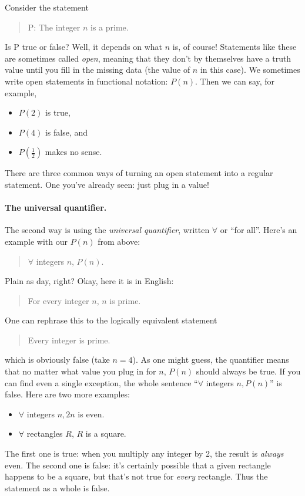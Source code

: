 \documentclass{tufte-book}
\begin{document}
Consider the statement
\begin{quote}
  P: The integer $n$ is a prime.
\end{quote}
Is P true or false? Well, it depends on what $n$ is, of course! Statements like these are sometimes called \emph{open}, meaning that they don't by themselves have a truth value until you fill in the missing data (the value of $n$ in this case). We sometimes write open statements in functional notation: $P(n)$. Then we can say, for example,
\begin{itemize}
    \item $P(2)$ is true,
    \item $P(4)$ is false, and
    \item $P(\frac12)$ makes no sense.
\end{itemize}

  There are three common ways of turning an open statement into a regular statement. One you've already seen: just plug in a value!

\paragraph{The universal quantifier.}
\label{sec:univ-quant}

The second way is using the \emph{universal quantifier}, written $\forall$ or ``for all''. Here's an example with our $P(n)$ from above:
  \begin{quote}
    $\forall$ integers $n$, $P(n)$.
  \end{quote}
  Plain as day, right? Okay, here it is in English:
  \begin{quote}
    For every integer $n$, $n$ is prime.
  \end{quote}
  One can rephrase this to the logically equivalent statement
  \begin{quote}
    Every integer is prime.
  \end{quote}
  which is obviously false (take $n = 4$). As one might guess, the quantifier means that no matter what value you plug in for $n$, $P(n)$ should always be true. If you can find even a single exception, the whole sentence ``$\forall$ integers $n, P(n)$'' is false. Here are two more examples:
  \begin{itemize}
      \item $\forall$ integers $n, 2n$ is even.
      \item $\forall$ rectangles $R$, $R$ is a square.
  \end{itemize}
  The first one is true: when you multiply any integer by 2, the result is \emph{always} even. The second one is false: it's certainly possible that a given rectangle happens to be a square, but that's not true for \emph{every} rectangle. Thus the statement as a whole is false.
\end{document}
